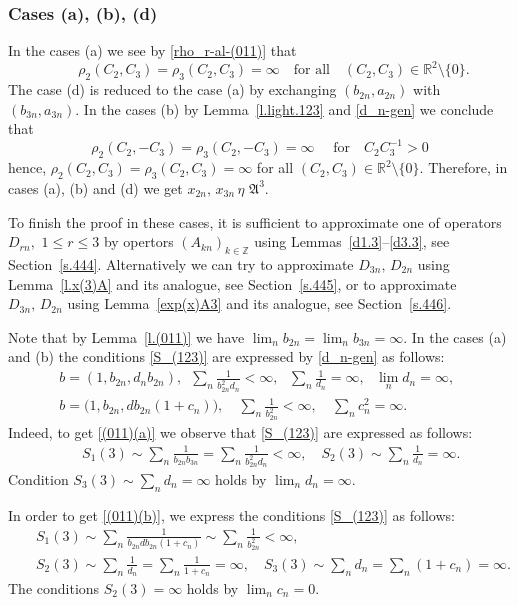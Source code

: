 \documentclass[preprint,12pt]{elsarticle}
\numberwithin{equation}{section}
\begin{document}
\subsubsection{Cases (a), (b), (d)}
%
\begin{rem}
\label{r.(011)} 
In the cases (a) 
we see by \eqref{rho_r-al-(011)} that $$\qquad \rho_2(C_2,C_3)=\rho_3(C_2,C_3)=\infty\quad\text{
for all}\quad (C_2,C_3)\in \mathbb R^2\setminus\{0\}.$$
The case (d) is reduced to the case (a) by exchanging $(b_{2n},a_{2n})$ with $(b_{3n},a_{3n})$.
In the cases (b) by  
Lemma~\ref{l.light.123}  and \eqref{d_n-gen}  we  conclude that 
$$
\rho_2(C_2,-C_3)=\rho_3(C_2,-C_3)=\infty\quad \text{ for}\quad C_2C_3^{-1}>0
$$
%
hence, $\rho_2(C_2,C_3)=\rho_3(C_2,C_3)=\infty$
for all $(C_2,C_3)\in \mathbb R^2\setminus\{0\}$. Therefore,   in cases (a), (b) and (d) we get
$x_{2n},\,x_{3n}\,\eta\,\, {\mathfrak A}^3$.

To finish the proof in these cases, it is sufficient to approximate one of operators $D_{rn},\,\,1\!\leq\! r\!\leq\! 3$ 
by opertors $(A_{kn})_{k\in \mathbb Z}$ using Lemmas~\ref{d1.3}--\ref{d3.3}, see Section~\ref{s.444}. Alternatively we can try to approximate $D_{3n},\,D_{2n}$ using Lemma~\ref{l.x(3)A} and its analogue,
see Section~\ref{s.445}, or to approximate $D_{3n},\,D_{2n}$  using Lemma~\ref{exp(x)A3} and its analogue, see Section~\ref{s.446}.
\end{rem}
Note that by Lemma~\ref{l.(011)} we have $\lim_nb_{2n}=\lim_nb_{3n}=\infty$.
In the cases  (a) and (b) the conditions \eqref{S_(123)} are expressed by  \eqref{d_n-gen} as follows:
%
\begin{eqnarray}
\label{(011)(a)}
&&b=(1,b_{2n},d_nb_{2n}),\,\,\, \sum_n\frac{1}{b_{2n}^2d_n}<\infty, \,\,\,\,\sum_n\frac{1}{d_n}=\infty,\,\,\,\,\lim_nd_n=\infty,\qquad
\\
\label{(011)(b)}
 &&
b=\big(1,b_{2n},db_{2n}(1+c_n)\big),\quad
\sum_n\frac{1}{b_{2n}^2}<\infty,\quad \sum_nc_n^2=\infty.\qquad
\end{eqnarray}
%
Indeed, to get \eqref{(011)(a)}  we observe that \eqref{S_(123)} are expressed as follows:
\begin{eqnarray*}
&& 
S_1(3)\!\sim\!\sum_n\frac{1}{b_{2n}b_{3n}}=\sum_n\frac{1}{b_{2n}^2d_n}<\infty,\quad 
S_2(3)\sim\sum_n\frac{1}{d_n}=\infty.
\end{eqnarray*}
Condition $S_3(3)\sim\sum_nd_n=\infty$ holds by $\lim_nd_n=\infty$.


In order to get \eqref{(011)(b)}, we express the conditions \eqref{S_(123)} as follows:
\begin{eqnarray*}
 &&
S_1(3)\!\sim\!\sum_n\frac{1}{b_{2n}db_{2n}(1+c_n)}\sim \sum_n\frac{1}{b_{2n}^2}
\!<\!\infty,\\
&&
S_2(3)\sim\sum_n\frac{1}{d_n}=
\sum_n\frac{1}{1+c_n}=\infty,\quad S_3(3)\sim\sum_nd_n\!=\!\sum_n(1+c_n)\!=\!\infty.
\end{eqnarray*}
The  conditions $S_2(3)=\infty$  holds by $\lim_nc_n=0$.
\end{document}
